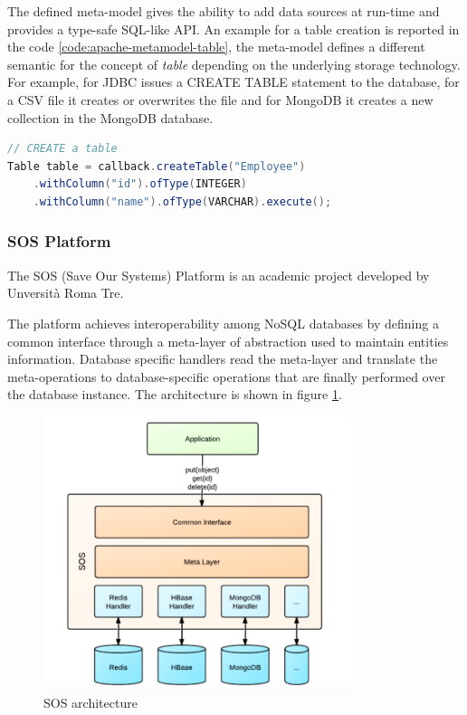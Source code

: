 \noindent The defined meta-model gives the ability to add data sources at run-time and provides a type-safe SQL-like API. An example for a table creation is reported in the code \ref{code:apache-metamodel-table}, the meta-model defines a different semantic for the concept of \textit{table} depending on the underlying storage technology. For example, for JDBC issues a CREATE TABLE statement to the database, for a CSV file it creates or overwrites the file and for MongoDB it creates a new collection in the MongoDB database.

\begin{lstlisting}[language=Java, caption=Apache MetaModel example, label=code:apache-metamodel-table]
// CREATE a table
Table table = callback.createTable("Employee")
    .withColumn("id").ofType(INTEGER)
    .withColumn("name").ofType(VARCHAR).execute();
\end{lstlisting}
            
\subsubsection{SOS Platform}
The SOS (Save Our Systems) Platform \cite{paper:sos-platform} is an academic project developed by Unversit\`{a} Roma Tre.

\noindent The platform achieves interoperability among NoSQL databases by defining a common interface through a meta-layer of abstraction used to maintain entities information. Database specific handlers read the meta-layer and translate the meta-operations to database-specific operations that are finally performed over the database instance.
The architecture is shown in figure \ref{fig:sos-architecture}.

\begin{figure}[tbh]
  \centering
  \includegraphics[width=9cm]{images/sos_architecture}
  \caption{SOS architecture \cite{paper:sos-platform}}
  \label{fig:sos-architecture}
\end{figure}

